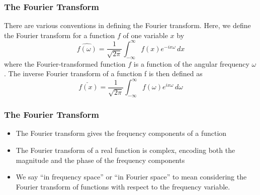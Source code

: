 \documentclass{beamer}
\begin{document}
\begin{frame}
	\frametitle{The Fourier Transform}
There are various conventions in defining the Fourier transform. Here, we define the Fourier transform for a function $f$ of one variable $x$ by
	$$ \hat{f(\omega)} = \frac{1}{\sqrt{2\pi}} \int_{-\infty}^{\infty}f(x)e^{-ix\omega} \, dx$$ 
where the Fourier-transformed function $f$ is a function of the angular frequency $\omega$. 
\newline 
		 \pause
The inverse Fourier transform of a function f is then defined as
	$$ \check{f(x)} = \frac{1}{\sqrt{2\pi}} \int_{-\infty}^{\infty}f(\omega)e^{ix\omega} \, d\omega$$ 
\end{frame}
\begin{frame}
	\frametitle{The Fourier Transform}
	\begin{itemize}
		\item The Fourier transform gives the frequency components of a function
		\item The Fourier transform of a real function is complex, encoding both the magnitude and the phase of the frequency components
		\item We say “in frequency space” or “in Fourier space” to mean considering the Fourier transform of functions with respect to the frequency variable.
	\end{itemize}
\end{frame}
\end{document}
